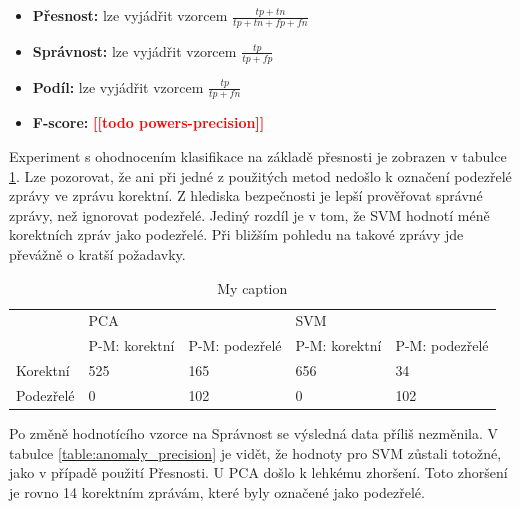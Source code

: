 \documentclass[thesis=M,czech]{FITthesis}[2012/10/20]
\newcommand{\todo}[1]{\textcolor{red}{\textbf{[[#1]]}}}
\begin{document}
			\begin{itemize} 
				\item \textbf{Přesnost: }  lze vyjádřit vzorcem $\frac{tp+tn}{tp+tn+fp+fn}$
				\item \textbf{Správnost: } lze vyjádřit vzorcem $\frac{tp}{tp+fp}$
				\item \textbf{Podíl: } lze vyjádřit vzorcem $\frac{tp}{tp+fn}$
				\item \textbf{F-score: } \todo{todo powers-precision}				
			\end{itemize}
		
			Experiment s ohodnocením klasifikace na základě přesnosti je zobrazen v tabulce \ref{table:anomaly_accuracy}. Lze pozorovat, že ani při jedné z použitých metod nedošlo k označení podezřelé zprávy ve zprávu korektní. Z hlediska bezpečnosti je lepší prověřovat správné zprávy, než ignorovat podezřelé. Jediný rozdíl je v tom, že SVM hodnotí méně korektních zpráv jako podezřelé. Při bližším pohledu na takové zprávy jde převážně o kratší požadavky.
			
			\begin{table}[htb]\centering
				\centering
				\caption{My caption}
				\label{table:anomaly_accuracy}
				\begin{tabular}{|l|l|l|l|l|}
					\hline
					\multirow{2}{*}{} & \multicolumn{2}{l|}{PCA}                 & \multicolumn{2}{l|}{SVM}                 \\ 
					& P-M: korektní & P-M: podezřelé & P-M: korektní & P-M: podezřelé \\ \hline
					Korektní          & 525                & 165                 & 656                & 34                  \\ \hline
					Podezřelé         & 0                  & 102                 & 0                  & 102                 \\ \hline
				\end{tabular}
			\end{table}
		
			Po změně hodnotícího vzorce na Správnost se výsledná data příliš nezměnila. V tabulce \ref{table:anomaly_precision} je vidět, že hodnoty pro SVM zůstali totožné, jako v případě použití Přesnosti. U PCA došlo k lehkému zhoršení. Toto zhoršení je rovno 14 korektním zprávám, které byly označené jako podezřelé.
		
\end{document}
